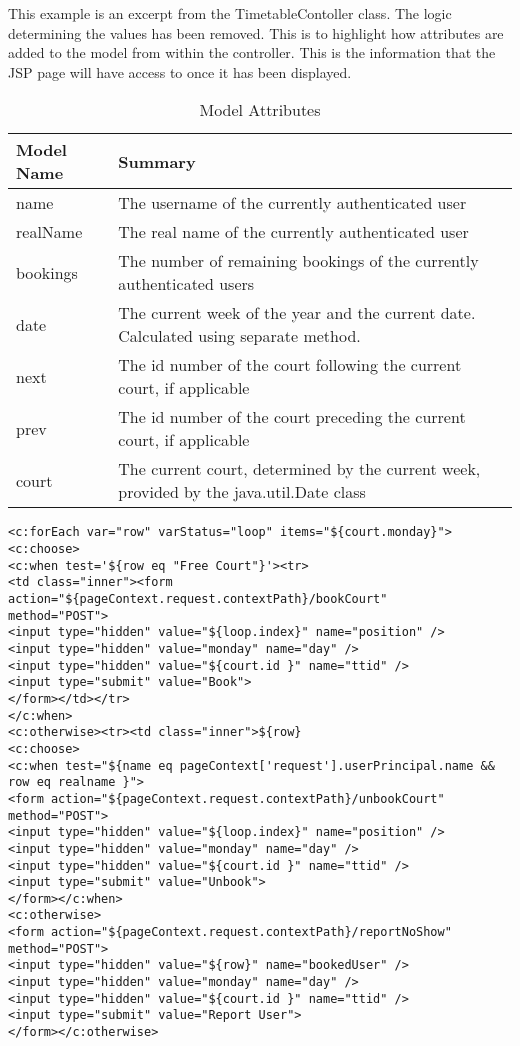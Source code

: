 This example is an excerpt from the TimetableContoller class. The logic determining the values has been removed. This is to highlight how attributes are added to the model from within the controller. This is the information that the JSP page will have access to once it has been displayed.\newline
\begin{table}
\begin{center}
    \begin{tabular}{ | l | l | p{5cm} |}
    \hline
    Model Name & Summary \\ \hline
    name & The username of the currently authenticated user  \\ \hline
    realName & The real name of the currently authenticated user\\ \hline
	bookings & The number of remaining bookings of the currently authenticated users\\ \hline
	date & The current week of the year and the current date. Calculated using separate method.\\ \hline
	next & The id number of the court following the current court, if applicable\\ \hline
    prev & The id number of the court preceding the current court, if applicable\\ \hline
	court & The current court, determined by the current week, provided by the java.util.Date class \\
    \hline
    \end{tabular}
\end{center}
\caption{Model Attributes}
\end{table}


\begin{lstlisting}
<c:forEach var="row" varStatus="loop" items="${court.monday}">
<c:choose>
<c:when test='${row eq "Free Court"}'><tr>
<td class="inner"><form action="${pageContext.request.contextPath}/bookCourt"
method="POST">
<input type="hidden" value="${loop.index}" name="position" />
<input type="hidden" value="monday" name="day" /> 
<input type="hidden" value="${court.id }" name="ttid" />
<input type="submit" value="Book">
</form></td></tr>
</c:when>
<c:otherwise><tr><td class="inner">${row}
<c:choose>
<c:when test="${name eq pageContext['request'].userPrincipal.name && row eq realname }">
<form action="${pageContext.request.contextPath}/unbookCourt" method="POST">
<input type="hidden" value="${loop.index}" name="position" />
<input type="hidden" value="monday" name="day" /> 
<input type="hidden" value="${court.id }" name="ttid" /> 
<input type="submit" value="Unbook">
</form></c:when>
<c:otherwise>
<form action="${pageContext.request.contextPath}/reportNoShow" method="POST">
<input type="hidden" value="${row}" name="bookedUser" />
<input type="hidden" value="monday" name="day" /> 
<input type="hidden" value="${court.id }" name="ttid" /> 
<input type="submit" value="Report User">
</form></c:otherwise>
\end{lstlisting}

